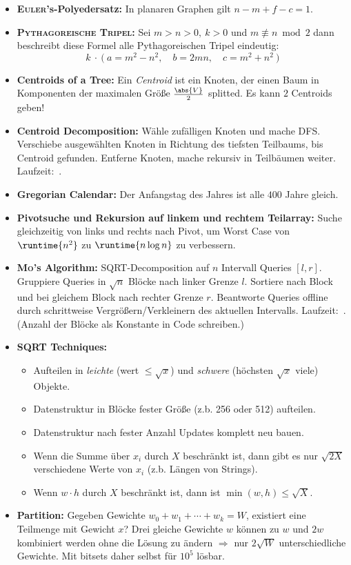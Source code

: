 \begin{itemize}
	\item \textbf{\textsc{Euler}'s-Polyedersatz:}
	In planaren Graphen gilt $n-m+f-c=1$.
	
	\item \textbf{\textsc{Pythagoreische Tripel}:}
	Sei $m>n>0,~k>0$ und $m\not\equiv n \bmod 2$ dann beschreibt diese Formel alle Pythagoreischen Tripel eindeutig:
	\[k~\cdot~\Big(~a=m^2-n^2,\quad b=2mn,\quad c=m^2+n^2~\Big)\]
	
	\item \textbf{Centroids of a Tree:}
	Ein \emph{Centroid} ist ein Knoten, der einen Baum in Komponenten der maximalen Größe $\frac{\abs{V}}{2}$ splitted.
	Es kann $2$ Centroids geben!
	
	\item \textbf{Centroid Decomposition:}
	Wähle zufälligen Knoten und mache DFS.
	Verschiebe ausgewählten Knoten in Richtung des tiefsten Teilbaums, bis Centroid gefunden. Entferne Knoten, mache rekursiv in Teilbäumen weiter. Laufzeit:~.
	\item \textbf{Gregorian Calendar:} Der Anfangstag des Jahres ist alle $400$ Jahre gleich.

	\item \textbf{Pivotsuche und Rekursion auf linkem und rechtem Teilarray:}
	Suche gleichzeitig von links und rechts nach Pivot, um Worst Case von
	$\runtime{n^2}$ zu $\runtime{n\log n}$ zu verbessern.
	
	\item \textbf{\textsc{Mo}'s Algorithm:}
	SQRT-Decomposition auf $n$ Intervall Queries $[l,r]$.
	Gruppiere Queries in $\sqrt{n}$ Blöcke nach linker Grenze $l$.
	Sortiere nach Block und bei gleichem Block nach rechter Grenze $r$.
	Beantworte Queries offline durch schrittweise Vergrößern/Verkleinern des aktuellen Intervalls.
	Laufzeit:~.
	(Anzahl der Blöcke als Konstante in Code schreiben.)
	
	\item \textbf{SQRT Techniques:}
	\begin{itemize}
		\item Aufteilen in \emph{leichte} (wert $\leq\sqrt{x}$) und \emph{schwere} (höchsten $\sqrt{x}$ viele) Objekte.
		\item Datenstruktur in Blöcke fester Größe (z.b. 256 oder 512) aufteilen.
		\item Datenstruktur nach fester Anzahl Updates komplett neu bauen.
		\item Wenn die Summe über $x_i$ durch $X$ beschränkt ist, dann gibt es nur $\sqrt{2X}$ verschiedene Werte von $x_i$ (z.b. Längen von Strings).
		\item Wenn $w\cdot h$ durch $X$ beschränkt ist, dann ist $\min(w,h)\leq\sqrt{X}$.
	\end{itemize}

	\item \textbf{Partition:}
	Gegeben Gewichte $w_0+w_1+\cdots+w_k=W$, existiert eine Teilmenge mit Gewicht $x$?
	Drei gleiche Gewichte $w$ können zu $w$ und $2w$ kombiniert werden ohne die Lösung zu ändern $\Rightarrow$ nur $2\sqrt{W}$ unterschiedliche Gewichte.
	Mit bitsets daher selbst für $10^5$ lösbar.
\end{itemize}

